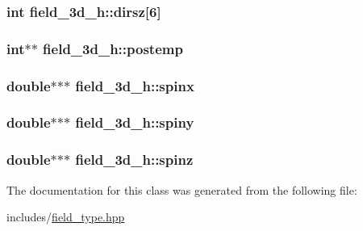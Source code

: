 \subsubsection[{\texorpdfstring{dirsz}{dirsz}}]{\setlength{\rightskip}{0pt plus 5cm}int field\+\_\+3d\+\_\+h\+::dirsz\mbox{[}6\mbox{]}\hspace{0.3cm}{\ttfamily [protected]}}\hypertarget{classfield__3d__h_af9adc2db425114219dbf8180cf8f47fd}{}\label{classfield__3d__h_af9adc2db425114219dbf8180cf8f47fd}
\subsubsection[{\texorpdfstring{postemp}{postemp}}]{\setlength{\rightskip}{0pt plus 5cm}int$\ast$$\ast$ field\+\_\+3d\+\_\+h\+::postemp\hspace{0.3cm}{\ttfamily [protected]}}\hypertarget{classfield__3d__h_acc1b62f03c4c546364f12507c8632360}{}\label{classfield__3d__h_acc1b62f03c4c546364f12507c8632360}
\subsubsection[{\texorpdfstring{spinx}{spinx}}]{\setlength{\rightskip}{0pt plus 5cm}double$\ast$$\ast$$\ast$ field\+\_\+3d\+\_\+h\+::spinx\hspace{0.3cm}{\ttfamily [protected]}}\hypertarget{classfield__3d__h_a9555e25d3918c95671b8bf5e54877c65}{}\label{classfield__3d__h_a9555e25d3918c95671b8bf5e54877c65}
\subsubsection[{\texorpdfstring{spiny}{spiny}}]{\setlength{\rightskip}{0pt plus 5cm}double$\ast$$\ast$$\ast$ field\+\_\+3d\+\_\+h\+::spiny\hspace{0.3cm}{\ttfamily [protected]}}\hypertarget{classfield__3d__h_a4e077beb71f0e370b1376b98ad9b22c6}{}\label{classfield__3d__h_a4e077beb71f0e370b1376b98ad9b22c6}
\subsubsection[{\texorpdfstring{spinz}{spinz}}]{\setlength{\rightskip}{0pt plus 5cm}double$\ast$$\ast$$\ast$ field\+\_\+3d\+\_\+h\+::spinz\hspace{0.3cm}{\ttfamily [protected]}}\hypertarget{classfield__3d__h_af5df1b887b63dc72f61812aeff434312}{}\label{classfield__3d__h_af5df1b887b63dc72f61812aeff434312}


The documentation for this class was generated from the following file\+:\begin{DoxyCompactItemize}
\item 
includes/\hyperlink{field__type_8hpp}{field\+\_\+type.\+hpp}\end{DoxyCompactItemize}
